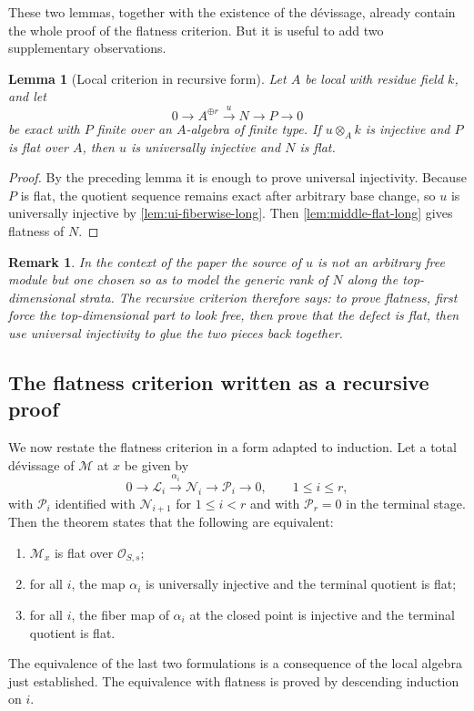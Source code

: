 \documentclass[11pt,oneside]{article}
\newtheorem{lemma}[theorem]{Lemma}
\newtheorem{remark}[theorem]{Remark}
\newcommand{\Lcal}{\mathcal L}
\newcommand{\M}{\mathcal M}
\newcommand{\N}{\mathcal N}
\newcommand{\Pcal}{\mathcal P}
\newcommand{\OO}{\mathcal O}
\begin{document}
These two lemmas, together with the existence of the d\'evissage, already contain the whole proof of the flatness criterion.  But it is useful to add two supplementary observations.

\begin{lemma}[Local criterion in recursive form]\label{lem:recursive-local-flatness}
Let $A$ be local with residue field $k$, and let
\[
0\to A^{\oplus r}\xrightarrow{u} N\to P\to 0
\]
be exact with $P$ finite over an $A$-algebra of finite type.  If $u\otimes_A k$ is injective and $P$ is flat over $A$, then $u$ is universally injective and $N$ is flat.
\end{lemma}

\begin{proof}
By the preceding lemma it is enough to prove universal injectivity.  Because $P$ is flat, the quotient sequence remains exact after arbitrary base change, so $u$ is universally injective by \cref{lem:ui-fiberwise-long}.  Then \cref{lem:middle-flat-long} gives flatness of $N$.
\end{proof}

\begin{remark}
In the context of the paper the source of $u$ is not an arbitrary free module but one chosen so as to model the generic rank of $N$ along the top-dimensional strata.  The recursive criterion therefore says: to prove flatness, first force the top-dimensional part to look free, then prove that the defect is flat, then use universal injectivity to glue the two pieces back together.
\end{remark}

\subsection{The flatness criterion written as a recursive proof}

We now restate the flatness criterion in a form adapted to induction.  Let a total d\'evissage of $\M$ at $x$ be given by
\[
0\to \Lcal_i\xrightarrow{\alpha_i}\N_i\to \Pcal_i\to 0,\qquad 1\le i\le r,
\]
with $\Pcal_i$ identified with $\N_{i+1}$ for $1\le i<r$ and with $\Pcal_r=0$ in the terminal stage.  Then the theorem states that the following are equivalent:
\begin{enumerate}[label=\textup{(\alph*)}]
\item $\M_x$ is flat over $\OO_{S,s}$;
\item for all $i$, the map $\alpha_i$ is universally injective and the terminal quotient is flat;
\item for all $i$, the fiber map of $\alpha_i$ at the closed point is injective and the terminal quotient is flat.
\end{enumerate}
The equivalence of the last two formulations is a consequence of the local algebra just established.  The equivalence with flatness is proved by descending induction on $i$.
\end{document}
